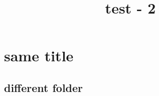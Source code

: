 \documentclass[11pt,reqno]{amsart}
\theoremstyle{definition}
\theoremstyle{remark}
\numberwithin{equation}{section}
\renewcommand{\(}{\left(}
\renewcommand{\)}{\right)}
\begin{document}
\title[]
{test - 2}

\maketitle

\section{same title}

\subsection{different folder}
\end{document}
